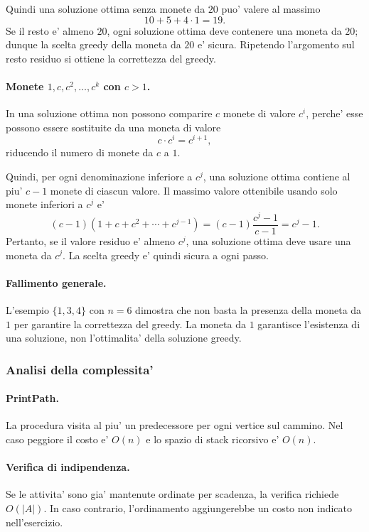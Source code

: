 Quindi una soluzione ottima senza monete da $20$ puo' valere al massimo
\[
10+5+4\cdot 1=19.
\]
Se il resto e' almeno $20$, ogni soluzione ottima deve contenere una moneta da $20$; dunque la scelta greedy della moneta da $20$ e' sicura. Ripetendo l'argomento sul resto residuo si ottiene la correttezza del greedy.

\paragraph{Monete $1,c,c^2,\ldots,c^k$ con $c>1$.}
In una soluzione ottima non possono comparire $c$ monete di valore $c^i$, perche' esse possono essere sostituite da una moneta di valore
\[
c\cdot c^i=c^{i+1},
\]
riducendo il numero di monete da $c$ a $1$.

Quindi, per ogni denominazione inferiore a $c^j$, una soluzione ottima contiene al piu' $c-1$ monete di ciascun valore. Il massimo valore ottenibile usando solo monete inferiori a $c^j$ e'
\[
(c-1)(1+c+c^2+\cdots+c^{j-1})
=(c-1)\frac{c^j-1}{c-1}
=c^j-1.
\]
Pertanto, se il valore residuo e' almeno $c^j$, una soluzione ottima deve usare una moneta da $c^j$. La scelta greedy e' quindi sicura a ogni passo.

\paragraph{Fallimento generale.}
L'esempio $\{1,3,4\}$ con $n=6$ dimostra che non basta la presenza della moneta da $1$ per garantire la correttezza del greedy. La moneta da $1$ garantisce l'esistenza di una soluzione, non l'ottimalita' della soluzione greedy.

\subsubsection{Analisi della complessita'}
\paragraph{PrintPath.}
La procedura visita al piu' un predecessore per ogni vertice sul cammino. Nel caso peggiore il costo e' $O(n)$ e lo spazio di stack ricorsivo e' $O(n)$.

\paragraph{Verifica di indipendenza.}
Se le attivita' sono gia' mantenute ordinate per scadenza, la verifica richiede $O(|A|)$. In caso contrario, l'ordinamento aggiungerebbe un costo non indicato nell'esercizio.

